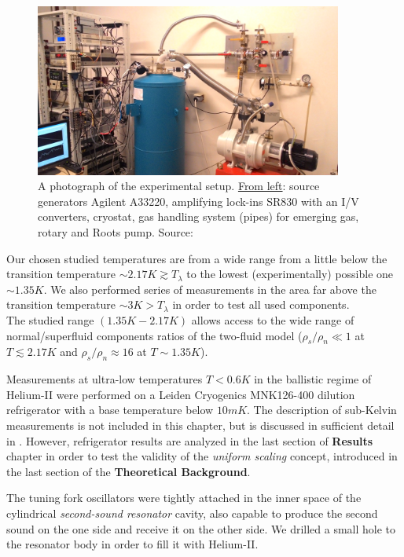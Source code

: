 \begin{figure}[h]
	\centering
	\includegraphics[width=0.9\textwidth]{graphics/exp/apparatus}
	\caption{A photograph of the experimental setup. \underline{From left}: source generators Agilent A33220, amplifying lock-ins SR830 with an I/V converters, cryostat, gas handling system (pipes) for emerging gas, rotary and Roots pump. Source: \cite{bakalaris}}
	\label{cryostat}
\end{figure}

Our chosen studied temperatures are from a wide range from a little below the transition temperature $\sim 2.17\unit{K} \gtrsim T_{\lambda}$ to the lowest (experimentally) possible one $ \sim 1.35\unit{K}$. We also performed series of measurements in the area far above the transition temperature $\sim 3 \unit{K} > T_{\lambda}$ in order to test all used components.\\
The studied range $(1.35\unit{K} - 2.17\unit{K})$ allows access to the wide range of normal/superfluid components ratios of the two-fluid model ($\rho_s / \rho_n \ll 1$ at $T\lesssim 2.17\unit{K}$ and $\rho_s / \rho_n \approx 16$ at $T\sim 1.35\unit{K}$).

Measurements at ultra-low temperatures $T < 0.6\unit{K}$ in the ballistic regime of Helium-II were performed on a Leiden Cryogenics MNK126-400 dilution refrigerator with a base temperature below $10 \unit{mK}$. The description of sub-Kelvin measurements is not included in this chapter, but is discussed in sufficient detail in \cite{universal_scaling}. However, refrigerator results are analyzed in the last section of \textbf{Results} chapter in order to test the validity of the \textit{uniform scaling} concept, introduced in the last section of the \textbf{Theoretical Background}.

\newpage

The tuning fork oscillators were tightly attached in the inner space of the cylindrical \textit{second-sound resonator} cavity, also capable to produce the second sound on the one side and receive it on the other side. We drilled a small hole to the resonator body in order to fill it with Helium-II.

